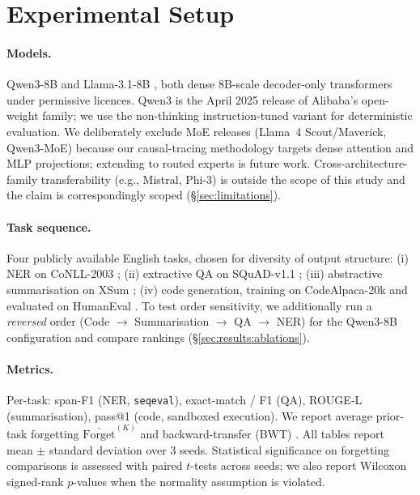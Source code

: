 \section{Experimental Setup}
\label{sec:experiments}

\paragraph{Models.} Qwen3-8B \citep{qwen3} and Llama-3.1-8B \citep{llama31}, both dense 8B-scale decoder-only transformers under permissive licences. Qwen3 is the April 2025 release of Alibaba's open-weight family; we use the non-thinking instruction-tuned variant for deterministic evaluation. We deliberately exclude MoE releases (Llama~4 Scout/Maverick, Qwen3-MoE) because our causal-tracing methodology targets dense attention and MLP projections; extending \fvs{} to routed experts is future work. Cross-architecture-family transferability (e.g., Mistral, Phi-3) is outside the scope of this study and the claim is correspondingly scoped (\S\ref{sec:limitations}).

\paragraph{Task sequence.} Four publicly available English tasks, chosen for diversity of output structure: (i) NER on CoNLL-2003 \citep{sang2003conll}; (ii) extractive QA on SQuAD-v1.1 \citep{rajpurkar2016squad}; (iii) abstractive summarisation on XSum \citep{narayan2018xsum}; (iv) code generation, training on CodeAlpaca-20k \citep{codealpaca} and evaluated on HumanEval \citep{chen2021humaneval}. To test order sensitivity, we additionally run a \textit{reversed} order (Code $\rightarrow$ Summarisation $\rightarrow$ QA $\rightarrow$ NER) for the Qwen3-8B configuration and compare \fvs{} rankings (\S\ref{sec:results:ablations}).

\paragraph{Metrics.} Per-task: span-F1 (NER, \texttt{seqeval}), exact-match / F1 (QA), ROUGE-L (summarisation), pass@1 (code, sandboxed execution). We report average prior-task forgetting $\bar{\mathrm{Forget}}^{(K)}$ and backward-transfer (BWT) \citep{lopez2017gem}. All tables report mean $\pm$ standard deviation over 3 seeds. Statistical significance on forgetting comparisons is assessed with paired $t$-tests across seeds; we also report Wilcoxon signed-rank $p$-values when the normality assumption is violated.

